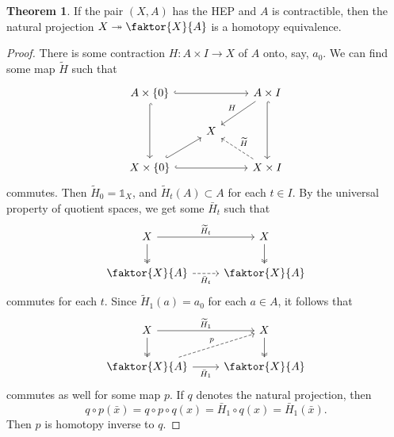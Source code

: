 \documentclass[10pt,letterpaper,cm]{nupset}
\theoremstyle{definition}
\theoremstyle{theorem}
\newtheorem{theorem}[definition]{Theorem}
\theoremstyle{remark}
\newcommand{\1}{\mathbb{1}}
\newcommand{\0}{\vec 0}
\begin{document}
\begin{theorem}
If the pair $\left(X, A\right)$ has the HEP and $A$ is contractible, then the natural projection $X \twoheadrightarrow \faktor{X}{A}$ is a homotopy equivalence. 
\end{theorem}
\begin{proof}
There is some contraction $H: A \times I\to X$ of $A$ onto, say, $a_0$. We can find some map $\widetilde{H}$ such that 
\[
\begin{tikzcd}
A\times \left\{0\right\} \arrow[rr, hook] \arrow[dd, hook] &  & A\times I \arrow[dd, hook] \arrow[ld, "H"'] \\
 & X &  \\
X\times \left\{0\right\} \arrow[rr, hook] \arrow[ru, hook] &  & X\times I \arrow[lu, "\widetilde{H}"', dashed]
\end{tikzcd}
\] commutes. Then $\widetilde{H}_0 = \1_X$, and $\widetilde{H}_t(A) \subset A$ for each $t\in I$. By the universal property of quotient spaces, we get some $\bar{H}_t$ such that
\[
\begin{tikzcd}
X \arrow[d, two heads] \arrow[r, "\widetilde{H}_t"] & X \arrow[d, two heads] \\
\faktor{X}{A} \arrow[r, "\bar{H}_t"', dashed] & \faktor{X}{A}
\end{tikzcd}
\] commutes for each $t$. Since $\widetilde{H}_1(a) = a_0$ for each $a\in A$, it follows that 
\[
\begin{tikzcd}
X \arrow[d, two heads] \arrow[r, "\widetilde{H}_1"] & X \arrow[d, two heads] \\
\faktor{X}{A} \arrow[r, "\bar{H}_1"'] \arrow[ru, "p", dashed] & \faktor{X}{A}
\end{tikzcd}
\] commutes as well for some map $p$. If $q$ denotes the natural projection, then $$q\circ p(\bar{x}) = q \circ p \circ q({x}) = \bar{H}_1 \circ q({x}) = \bar{H}_1(\bar{x}).$$ Then $p$ is homotopy inverse to $q$.
\end{proof}
\end{document}
